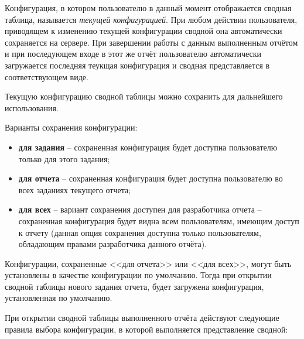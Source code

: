 \documentclass[../user-manual.tex]{subfiles}
\begin{document}
	Конфигурация, в котором пользователю в данный момент отображается сводная таблица, называется \textit{текущей конфигурацией}. При любом действии пользователя, приводящем к изменению текущей конфигурации сводной она автоматически сохраняется на сервере. При завершении работы с данным выполненным отчётом и при последующем входе в этот же отчёт пользователю автоматически загружается последняя теукщая конфигурация и сводная представляется в соответствующем виде.
	
	Текущую конфигурацию сводной таблицы можно сохранить для дальнейшего использования.
	
	Варианты сохранения конфигурации:
	
	\begin{itemize}
		
		\item \textbf{для задания} -- сохраненная конфигурация будет доступна пользователю только для этого задания;
		
		\item \textbf{для отчета} -- сохраненная конфигурация будет доступна пользователю во всех заданиях текущего отчета;
		
		\item \textbf{для всех} -- вариант сохранения доступен для разработчика отчета -- сохраненная конфигурация будет видна всем пользователям, имеющим доступ к отчету (данная опция сохранения доступна только пользователям, обладающим правами разработчика данного отчёта).
		
	\end{itemize}

	Конфигурации, сохраненные <<для отчета>> или <<для всех>>, могут быть установлены в качестве конфигурации по умолчанию. Тогда при открытии сводной таблицы нового задания отчета, будет загружена конфигурация, установленная по умолчанию.
	
	При открытии сводной таблицы выполненного отчёта действуют следующие правила выбора конфигурации, в которой выполняется представление сводной:
	
\end{document}
